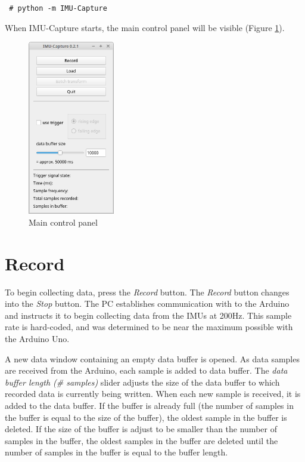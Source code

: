 \documentclass[11pt,letterpaper,article,oneside]{memoir}
\newcommand{\name}{IMU-Capture}
\begin{document}
\texttt{
\# python -m \name{}
}

When \name{} starts, the main control panel will be visible (Figure
\ref{fig:control}).

\begin{figure}[]
    \begin{center}
        \includegraphics[height=3in]{main_panel}
    \end{center}
    \caption{Main control panel} 
    \label{fig:control}
\end{figure}




\section{Record}

To begin collecting data, press the \emph{Record} button.  The \emph{Record} button
changes into the \emph{Stop} button.  The PC establishes communication with to the
Arduino and instructs it to begin collecting data from the IMUs at 200Hz. This
sample rate is hard-coded, and was determined to be near the maximum possible
with the Arduino Uno.

A new data window containing an empty data buffer is opened. As data samples are received
from the Arduino, each sample is added to data buffer.
The \emph{data buffer length (\# samples)} slider adjusts the size of the data
buffer to which recorded data is currently being written.  When each new sample
is received, it is added to the data buffer. If the buffer is already full (the
number of samples in the buffer is equal to the size of the buffer), the oldest
sample in the buffer is deleted. If the size of the buffer is adjust to be
smaller than the number of samples in the buffer, the oldest samples in the
buffer are deleted until the number of samples in the buffer is equal to the
buffer length.
\end{document}
